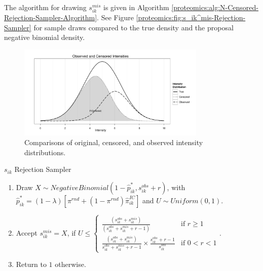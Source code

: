 The algorithm for drawing $s_{ik}^{mis}$ is given in Algorithm \ref{proteomics:alg:N-Censored-Rejection-Sampler-Algorithm}.
See Figure \ref{proteomics:fig:s_ik^mis-Rejection-Sampler} for sample draws compared
to the true density and the proposal negative binomial density.

\ifx\nofigures\undefined
\begin{figure}[http]
\centering
\includegraphics[width=0.8\textwidth]{figures/proteomics/Fig2_Observed_Censored_Intensity_Distributions}
\caption{Comparisons of original, censored, and observed intensity distributions. \label{proteomics:fig:Laplace_Halleys_Outline}}
\end{figure}
\fi

\begin{algorithm}[H]
\caption{$s_{ik}$ Rejection Sampler\label{proteomics:alg:N-Censored-Rejection-Sampler-Algorithm}}

\begin{enumerate}
\item Draw $X\sim NegativeBinomial(1-\hat{p}_{ik}^{*},s_{ik}^{obs}+r)$, with $\hat{p}_{ik}^{*}=(1-\lambda)\left[\pi^{rnd}+(1-\pi^{rnd})\hat{\pi}_{ik}^{IC}\right]$
and $U\sim Uniform(0,1)$.
\item Accept $s_{ik}^{mis}=X$, if $U\leq\begin{cases}
\frac{(s_{ik}^{obs}+s_{ik}^{mis})}{(s_{ik}^{obs}+s_{ik}^{mis}+r-1)} & \text{if }r\geq1\\
\frac{(s_{ik}^{obs}+s_{ik}^{mis})}{s_{ik}^{obs}+s_{ik}^{mis}+r-1}\times\frac{s_{ik}^{obs}+r-1}{s_{ik}^{obs}} & \text{if }0<r<1
\end{cases}$.
\item Return to $1$ otherwise.\end{enumerate}
\end{algorithm}

